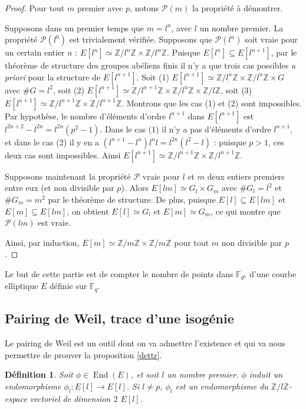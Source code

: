 \documentclass{article}
\theoremstyle{plain}%
\newtheorem{deff}[thm]{Définition}
\theoremstyle{definition}%
\newcommand{\F}{\mathbb{F}}
\newcommand{\Z}{\mathbb{Z}}
\DeclareMathOperator{\End}{End}
\begin{document}
\begin{proof}
  Pour tout $m$ premier avec $p$, notons $\mathcal P(m)$ la propriété à démontrer.

  Supposons dans un premier temps que $m=l^n$, avec $l$ un nombre premier. La propriété $\mathcal P(l^0)$ est trivialement vérifiée. Supposons que $\mathcal P(l^n)$ soit vraie pour un certain entier $n$ : $E[l^n] \simeq \Z/l^n\Z \times \Z/l^n\Z$. Puisque $E[l^n] \subseteq E[l^{n+1}]$, par le théorème de structure des groupes abéliens finis il n'y a que trois cas possibles \emph{a priori} pour la structure de $E[l^{n+1}]$. Soit (1)   $E[l^{n+1}]  \simeq \Z/l^n\Z \times \Z/l^n\Z \times G$ avec $\#G=l^2$, soit (2)   $E[l^{n+1}]  \simeq \Z/l^{n+1}\Z \times \Z/l^n\Z\times \Z/l\Z$, soit (3) $E[l^{n+1}]  \simeq \Z/l^{n+1}\Z \times \Z/l^{n+1}\Z$. Montrons que les cas (1) et (2) sont impossibles. Par hypothèse, le nombre d'éléments d'ordre $l^{n+1}$ dans $E[l^{n+1}]$ est $l^{2n+2} - l^{2n} = l^{2n}(p^2 -1)$. Dans le cas (1) il n'y a pas d'éléments d'ordre $l^{n+1}$, et dans le cas (2) il y en a $(l^{n+1} - l^n)l^nl = l^{2n}(l^2-l)$ : puisque $p>1$, ces deux cas sont impossibles. Ainsi $E[l^{n+1}]  \simeq \Z/l^{n+1}\Z \times \Z/l^{n+1}\Z$.

  Supposons maintenant la propriété $\mathcal P$ vraie pour $l$ et $m$ deux entiers premiers entre eux (et non divisible par $p$). Alors $E[lm]\simeq G_l \times G_m$ avec $\#G_l = l^2$ et $\#G_m = m^2$ par le théorème de structure. De plus, puisque $E[l]\subseteq E[lm]$ et  $E[m]\subseteq E[lm]$, on obtient $E[l]\simeq G_l$ et $E[m]\simeq G_m$, ce qui montre que $\mathcal P(lm)$ est vraie.

  Ainsi, par induction, $E[m] \simeq {\Z}/{m\Z} \times  {\Z}/{m\Z}$ pour tout $m$ non divisible par $p$.
\end{proof}



Le but de cette partie est de compter le nombre de points dans $\F_{q^n}$ d'une courbe elliptique $E$ définie sur $\F_q$.

\subsection{Pairing de Weil, trace d'une isogénie}

Le pairing de Weil est un outil dont on va admettre l'existence et qui va nous permettre de prouver la proposition \ref{dettr}.

\begin{deff}
  Soit $\phi\in \End(E)$, et soit $l$ un nombre premier. $\phi$ induit un endomorphisme $\phi_l : E[l] \to E[l]$. Si $l\neq p$, $\phi_l$ est un endomorphisme du $\Z/l\Z$-espace vectoriel de dimension $2$ $E[l]$. 
\end{deff}
\end{document}
